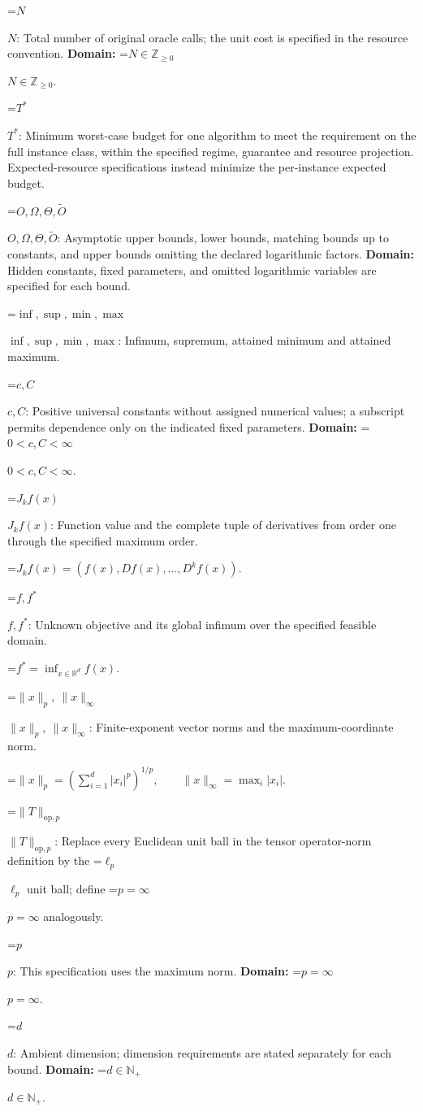 \documentclass[10pt,a4paper]{article}
\newcommand{\AtlasMath}[1]{\par\begingroup\centering\setbox0=\hbox{$\displaystyle #1$}\ifdim\wd0>1.4\linewidth\typeout{ATLAS WIDE FORMULA: \the\wd0}\fi\ifdim\wd0>\linewidth\resizebox{\linewidth}{!}{\box0}\else\box0\fi\par\endgroup}
\newcommand{\AtlasInlineMath}[1]{\begingroup\setbox0=\hbox{$#1$}\ifdim\wd0>.4\linewidth\endgroup\AtlasMath{#1}\else\endgroup$#1$\fi}
\begin{document}
\AtlasInlineMath{N}: Total number of original oracle calls; the unit cost is specified in the resource convention. \textbf{Domain:} \AtlasInlineMath{N\in\mathbb{Z}_{\ge0}}.

\AtlasInlineMath{T^*}: Minimum worst-case budget for one algorithm to meet the requirement on the full instance class, within the specified regime, guarantee and resource projection. Expected-resource specifications instead minimize the per-instance expected budget.

\AtlasInlineMath{O,\Omega,\Theta,\widetilde{O}}: Asymptotic upper bounds, lower bounds, matching bounds up to constants, and upper bounds omitting the declared logarithmic factors. \textbf{Domain:} Hidden constants, fixed parameters, and omitted logarithmic variables are specified for each bound.

\AtlasInlineMath{\inf,\sup,\min,\max}: Infimum, supremum, attained minimum and attained maximum.

\AtlasInlineMath{c,C}: Positive universal constants without assigned numerical values; a subscript permits dependence only on the indicated fixed parameters. \textbf{Domain:} \AtlasInlineMath{0<c,C<\infty}.

\AtlasInlineMath{J_{k}f(x)}: Function value and the complete tuple of derivatives from order one through the specified maximum order.


\AtlasMath{J_{k}f(x)=(f(x),Df(x),\ldots,D^{k}f(x)).}


\AtlasInlineMath{f,f^*}: Unknown objective and its global infimum over the specified feasible domain.


\AtlasMath{f^*=\inf_{x\in \mathbb{R}^d}f(x).}


\AtlasInlineMath{\|x\|_p,\ \|x\|_\infty}: Finite-exponent vector norms and the maximum-coordinate norm.


\AtlasMath{\|x\|_p=\left(\sum_{i=1}^d|x_i|^p\right)^{1/p},\qquad\|x\|_\infty=\max_i|x_i|.}


\AtlasInlineMath{\|T\|_{\mathrm{op},p}}: Replace every Euclidean unit ball in the tensor operator-norm definition by the \AtlasInlineMath{\ell_p} unit ball; define \AtlasInlineMath{p=\infty} analogously.

\AtlasInlineMath{p}: This specification uses the maximum norm. \textbf{Domain:} \AtlasInlineMath{p=\infty}.

\AtlasInlineMath{d}: Ambient dimension; dimension requirements are stated separately for each bound. \textbf{Domain:} \AtlasInlineMath{d\in\mathbb{N}_{+}}.
\end{document}
